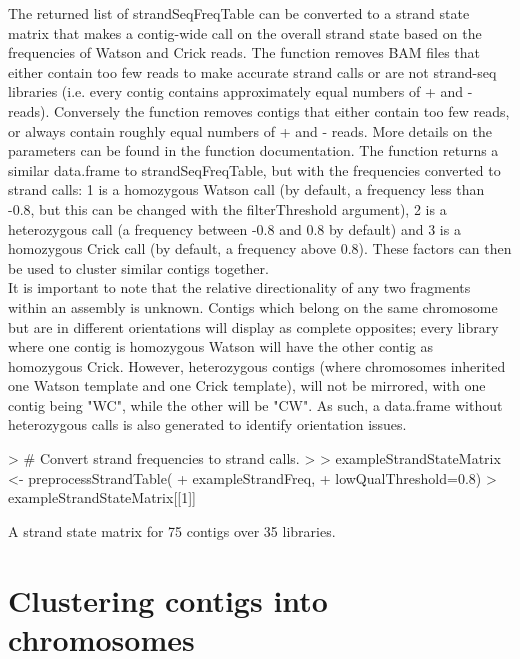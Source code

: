 \documentclass{article}
\begin{document}
The returned list of strandSeqFreqTable can be converted to a strand state matrix that makes a contig-wide call on the overall strand state based on the frequencies of Watson and Crick reads. The function removes BAM files that either contain too few reads to make accurate strand calls or are not strand-seq libraries (i.e. every contig contains approximately equal numbers of + and - reads). Conversely the function removes contigs that either contain too few reads, or always contain roughly equal numbers of + and - reads.  More details on the parameters can be found in the function documentation.  The function returns a similar data.frame to strandSeqFreqTable, but with the frequencies converted to strand calls: 1 is a homozygous Watson call (by default, a frequency less than -0.8, but this can be changed with the filterThreshold argument), 2 is a heterozygous call (a frequency between -0.8 and 0.8 by default) and 3 is a homozygous Crick call (by default, a frequency above 0.8).  These factors can then be used to cluster similar contigs together.\\

It is important to note that the relative directionality of any two fragments within an assembly is unknown. Contigs which belong on the same chromosome but are in different orientations will display as complete opposites; every library where one contig is homozygous Watson will have the other contig as homozygous Crick.  However, heterozygous contigs (where chromosomes inherited one Watson template and one Crick template), will not be mirrored, with one contig being "WC", while the other will be "CW".  As such, a data.frame without heterozygous calls is also generated to identify orientation issues.  

\begin{Schunk}
\begin{Sinput}
> # Convert strand frequencies to strand calls.
> 
> exampleStrandStateMatrix <- preprocessStrandTable(
+ exampleStrandFreq, 
+ lowQualThreshold=0.8)
> exampleStrandStateMatrix[[1]]
\end{Sinput}
\begin{Soutput}
A strand state matrix for  75  contigs over  35  libraries.
\end{Soutput}
\end{Schunk}

\section{Clustering contigs into chromosomes}
\end{document}
